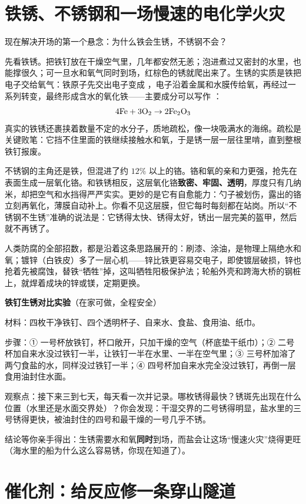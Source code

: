 \section{铁锈、不锈钢和一场慢速的电化学火灾}

现在解决开场的第一个悬念：为什么铁会生锈，不锈钢不会？

先看铁锈。把铁钉放在干燥空气里，几年都安然无恙；泡进煮过又密封的水里，也能撑很久；可一旦水和氧气同时到场，红棕色的锈就爬出来了。生锈的实质是铁把电子交给氧气：铁原子先交出电子变成 ，电子沿着金属和水膜传给氧，再经过一系列转变，最终形成含水的氧化铁——主要成分可以写作 ：
\[\mathrm{4Fe} + \mathrm{3O_2} \rightarrow \mathrm{2Fe_2O_3}\]
真实的铁锈还裹挟着数量不定的水分子，质地疏松，像一块吸满水的海绵。疏松是关键败笔：它挡不住里面的铁继续接触水和氧，于是锈一层一层往里啃，直到整根铁钉报废。

不锈钢的主角还是铁，但混进了约 $12\%$ 以上的铬。铬和氧的亲和力更强，抢先在表面生成一层氧化铬。和铁锈相反，这层氧化铬\textbf{致密、牢固、透明}，厚度只有几纳米，却把空气和水挡得严严实实。更妙的是它有自愈能力：勺子被划伤，露出的铬立刻再氧化，薄膜自动补上。你看不见这层膜，但它每时每刻都在站岗。所以“不锈钢不生锈”准确的说法是：它锈得太快、锈得太好，锈出一层完美的盔甲，然后就不再锈了。

人类防腐的全部招数，都是沿着这条思路展开的：刷漆、涂油，是物理上隔绝水和氧；镀锌（白铁皮）多了一层心机——锌比铁更容易交电子，即使镀层破损，锌也抢着先被腐蚀，替铁“牺牲”掉，这叫牺牲阳极保护法；轮船外壳和跨海大桥的钢桩上，就焊着成块的锌或镁，定期更换。

\begin{shiyan}
\textbf{铁钉生锈对比实验}（在家可做，全程安全）

材料：四枚干净铁钉、四个透明杯子、自来水、食盐、食用油、纸巾。

步骤：① 一号杯放铁钉，杯口敞开，只加干燥的空气（杯底垫干纸巾）；② 二号杯加自来水没过铁钉一半，让铁钉一半在水里、一半在空气里；③ 三号杯加溶了两勺食盐的水，同样没过铁钉一半；④ 四号杯加自来水完全没过铁钉，再倒一层食用油封住水面。

观察点：接下来三到七天，每天看一次并记录。哪枚锈得最快？锈斑先出现在什么位置（水里还是水面交界处）？你会发现：干湿交界的二号锈得明显，盐水里的三号锈得更快，被油封住的四号和最干燥的一号几乎不锈。

结论等你亲手得出：生锈需要水和氧\textbf{同时}到场，而盐会让这场“慢速火灾”烧得更旺（海水里的船为什么这么容易锈，你现在知道了）。
\end{shiyan}

\section{催化剂：给反应修一条穿山隧道}

